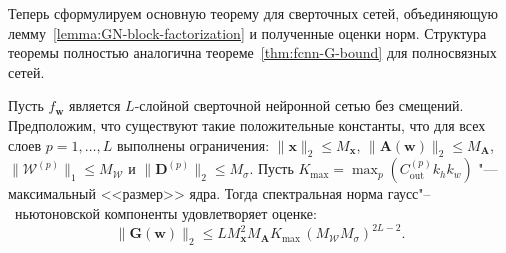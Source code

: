 Теперь сформулируем основную теорему для сверточных сетей, объединяющую лемму~\ref{lemma:GN-block-factorization} и полученные оценки норм. Структура теоремы полностью аналогична теореме~\ref{thm:fcnn-G-bound} для полносвязных сетей.

\begin{theorem}
\label{thm:cnn-bound}
Пусть $f_{\mathbf{w}}$ является $L$-слойной сверточной нейронной сетью без смещений. Предположим, что существуют такие положительные константы, что для всех слоев $p = 1, \ldots, L$ выполнены ограничения: $\|\mathbf{x}\|_2 \leqslant M_{\mathbf{x}}$, $\|\mathbf{A}(\mathbf{w})\|_2 \leqslant M_{\mathbf{A}}$, $\|\mathcal{W}^{(p)}\|_1 \leqslant M_{\mathcal{W}}$ и $\|\mathbf{D}^{(p)}\|_2 \leqslant M_{\sigma}$. Пусть $K_{\max} = \max_p \left(C_{\text{out}}^{(p)} k_h k_w\right)$ "--- максимальный <<размер>> ядра. Тогда спектральная норма гаусс"--~ньютоновской компоненты удовлетворяет оценке:
\begin{equation}
    \label{eq:cnn-final-bound}
    \|\mathbf{G}(\mathbf{w})\|_2 \leqslant
    L M_{\mathbf{x}}^2 M_{\mathbf{A}}  K_{\max} \,
    \left( M_{\mathcal{W}} M_{\sigma} \right)^{2L-2}.
    \end{equation}
\end{theorem}

